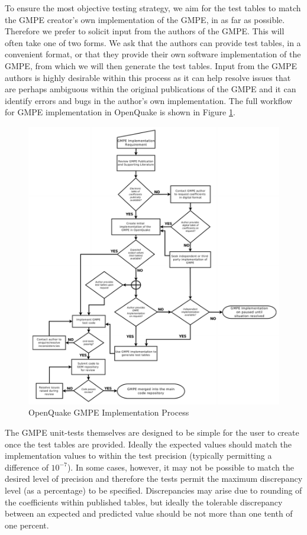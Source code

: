 To ensure the most objective testing strategy, we aim for the test tables 
to match the GMPE creator's own implementation of the GMPE, in as far as 
possible. Therefore we prefer to solicit input from the authors of the GMPE. 
This will often take one of two forms. We ask that the authors can provide 
test tables, in a convenient format, or that they provide their own software 
implementation of the GMPE, from which we will then generate the test tables.
Input from the GMPE authors is highly desirable within this process as it 
can help resolve issues that are perhaps ambiguous within the original
publications of the GMPE and it can identify errors and bugs in the 
author's own implementation. The full workflow for GMPE implementation 
in OpenQuake is shown in Figure \ref{fig:gmpe_flowchart}.

\begin{figure}[htbp]
  \centering
  \includegraphics[width=\textwidth]{./qareport/pictures/gmpe_implementation_flowchart.pdf}
  \caption{OpenQuake GMPE Implementation Process}
  \label{fig:gmpe_flowchart}
\end{figure}

The GMPE unit-tests themselves are designed to be simple for the user to
create once the test tables are provided. Ideally the expected values 
should match the implementation values to within the test precision 
(typically permitting a difference of $10^{-7}$).
In some cases, however, it may not be possible to match the desired level 
of precision and therefore the tests permit the maximum discrepancy level 
(as a percentage) to be specified. Discrepancies may arise due to rounding 
of the coefficients within published tables, but ideally the tolerable 
discrepancy between an expected and predicted value should be not more 
than one tenth of one percent.

